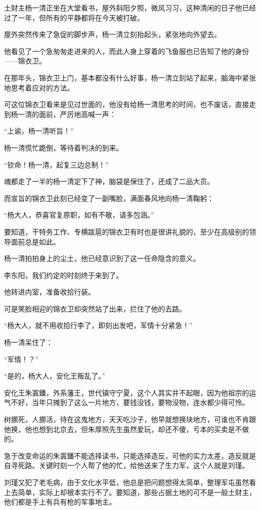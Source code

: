 \begin{multicols}{\theparacolNo}
		土财主杨一清正坐在大堂看书，屋外斜阳夕照，微风习习，这种清闲的日子他已经过了一年，但所有的平静都将在今天被打破。

		屋外突然传来了急促的脚步声，杨一清立刻抬起头，紧张地向外望去。

		他看见了一个急匆匆走进来的人，而此人身上穿着的飞鱼服也已告知了他的身份——锦衣卫。

		在那年头，锦衣卫上门，基本都没有什么好事，杨一清立刻站了起来，脑海中紧张地思考着应对的方法。

		可这位锦衣卫看来是见过世面的，他没有给杨一清思考的时间，也不废话，直接走到杨一清的面前，严厉地高喊一声：

		“上谕，杨一清听旨！”

		杨一清慌忙跪倒，等待着判决的到来。

		“钦命！杨一清，起复三边总制！”

		魂都走了一半的杨一清定下了神，脑袋是保住了，还成了二品大员。

		而宣旨的锦衣卫此刻已经变了一副嘴脸，满面春风地向杨一清鞠躬：

		“杨大人，恭喜官复原职，如有不敬，请多包涵。”

		要知道，干特务工作、专横跋扈的锦衣卫有时也是很讲礼貌的，至少在高级别的领导面前总是如此。

		杨一清拍拍身上的尘土，他已经意识到了这一任命隐含的意义。

		李东阳，我们约定的时刻终于来到了。

		他转进内室，准备收拾行装。

		可是笑脸相迎的锦衣卫却突然站了出来，拦住了他的去路。

		“杨大人，就不用收拾行李了，即刻出发吧，军情十分紧急！”

		杨一清呆住了：

		“军情！？”

		“是的，杨大人，安化王叛乱了。”

		安化王朱寘鐇，外系藩王，世代镇守宁夏，这个人其实并不起眼，因为他祖宗的运气不好，当年只摊到了这么一片地方，要钱没钱，要物没物，连水都少得可怜。

		树挪死，人挪活，待在这鬼地方，天天吃沙子，他早就想换块地方，可谁也不肯跟他换，他也想到北京去，但朱厚照先生虽然爱玩，却还不傻，亏本的买卖是不做的。

		急于改变命运的朱寘鐇不能选择读书，只能选择造反，可他的实力太差，造反就是自寻死路。关键时刻一个人帮了他的忙，给他送来了生力军，这个人就是刘瑾。

		刘瑾又犯了老毛病，由于文化水平低，他总是把问题想得太简单，整理军屯虽然看上去简单，实际上却根本实行不了。要知道，那些占据土地的可不是一般土财主，他们都是手上有兵有枪的军事地主。


\end{multicols}
